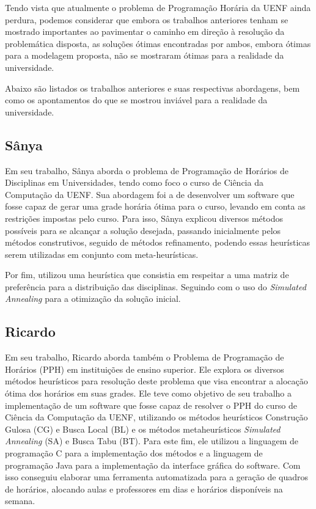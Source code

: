 Tendo vista que atualmente o problema de Programação Horária da UENF ainda perdura, podemos considerar que embora os trabalhos anteriores tenham se mostrado importantes ao pavimentar o caminho em direção à resolução da problemática disposta, as soluções ótimas encontradas por ambos, embora ótimas para a modelagem proposta, não se mostraram ótimas para a realidade da universidade.

Abaixo são listados os trabalhos anteriores e suas respectivas abordagens, bem como os apontamentos do que se mostrou inviável para a realidade da universidade.

\subsection{Sânya} %

Em seu trabalho, Sânya aborda o problema de Programação de Horários de Disciplinas em Universidades, tendo como foco o curso de Ciência da Computação da UENF. Sua abordagem foi a de desenvolver um software que fosse capaz de gerar uma grade horária ótima para o curso, levando em conta as restrições impostas pelo curso. Para isso, Sânya explicou diversos métodos possíveis para se alcançar a solução desejada, passando inicialmente pelos métodos construtivos, seguido de métodos refinamento, podendo essas heurísticas serem utilizadas em conjunto com meta-heurísticas.

Por fim, utilizou uma heurística que consistia em respeitar a uma matriz de preferência para a distribuição das disciplinas. Seguindo com o uso do \textit{Simulated Annealing} para a otimização da solução inicial.

\subsection{Ricardo} %

Em seu trabalho, Ricardo aborda também o Problema de Programação de Horários (PPH) em instituições de ensino superior. Ele explora os diversos métodos heurísticos para resolução deste problema que visa encontrar a alocação ótima dos horários em suas grades. Ele teve como objetivo de seu trabalho a implementação de um software que fosse capaz de resolver o PPH do curso de Ciência da Computação da UENF, utilizando os métodos heurísticos Construção Gulosa (CG) e Busca Local (BL) e os métodos metaheurísticos \textit{Simulated Annealing} (SA) e Busca Tabu (BT). Para este fim, ele utilizou a linguagem de programação C para a implementação dos métodos e a linguagem de programação Java para a implementação da interface gráfica do software. Com isso conseguiu elaborar uma ferramenta automatizada para a geração de quadros de horários, alocando aulas e professores em dias e horários disponíveis na semana.

